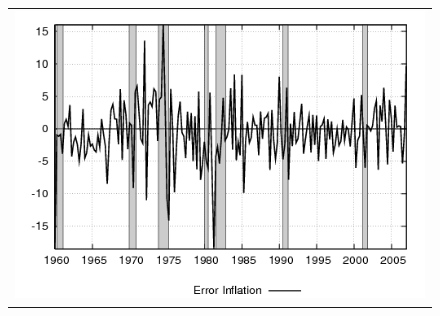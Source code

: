 \documentclass[12pt]{article}
\begin{document}
\begin{figure}[ht]
\begin{center}
\begin{tabular}{c}
\includegraphics[scale=0.5]{results_cg_wlsinit/inflation_err.png} 
\end{tabular}
\end{center}
\end{figure}
\end{document}

